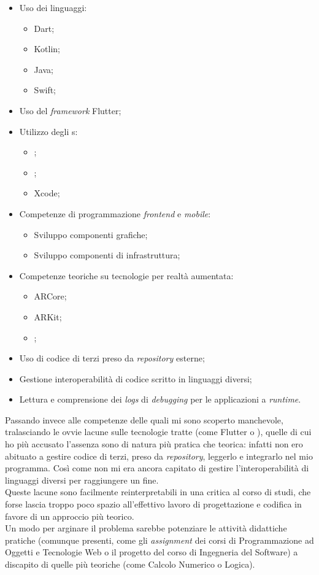 \begin{itemize}
  \item Uso dei linguaggi:
      \begin{itemize}
        \item Dart;
        \item Kotlin;
        \item Java;
        \item Swift;
      \end{itemize}
  \item Uso del \textit{framework} Flutter;
  \item Utilizzo degli \ide{}s:
      \begin{itemize}
        \item \vsc{};
        \item \astudio{};
        \item Xcode;
      \end{itemize}
  \item Competenze di programmazione \textit{frontend} e \textit{mobile}:
      \begin{itemize}
        \item Sviluppo componenti grafiche;
        \item Sviluppo componenti di infrastruttura;
      \end{itemize}
  \item Competenze teoriche su tecnologie per realtà aumentata:
      \begin{itemize}
        \item ARCore;
        \item ARKit;
        \item \asa;
      \end{itemize}
  \item Uso di codice di terzi preso da \textit{repository} esterne;
  \item Gestione interoperabilità di codice scritto in linguaggi diversi;
  \item Lettura e comprensione dei \textit{logs} di \textit{debugging} per le applicazioni a \textit{runtime}.
\end{itemize}

Passando invece alle competenze delle quali mi sono scoperto manchevole, tralasciando le ovvie lacune sulle tecnologie tratte (come Flutter o \asa{}), quelle di cui ho più accusato l'assenza sono di natura più pratica che teorica: infatti non ero abituato a gestire codice di terzi, preso da \textit{repository}, leggerlo e integrarlo nel mio programma. Così come non mi era ancora capitato di gestire l'interoperabilità di linguaggi diversi per raggiungere un fine.\\
Queste lacune sono facilmente reinterpretabili in una critica al corso di studi, che forse lascia troppo poco spazio all'effettivo lavoro di progettazione e codifica in favore di un approccio più teorico.\\
Un modo per arginare il problema sarebbe potenziare le attività didattiche pratiche (comunque presenti, come gli \textit{assignment} dei corsi di Programmazione ad Oggetti e Tecnologie Web o il progetto del corso di Ingegneria del Software) a discapito di quelle più teoriche (come Calcolo Numerico o Logica).
